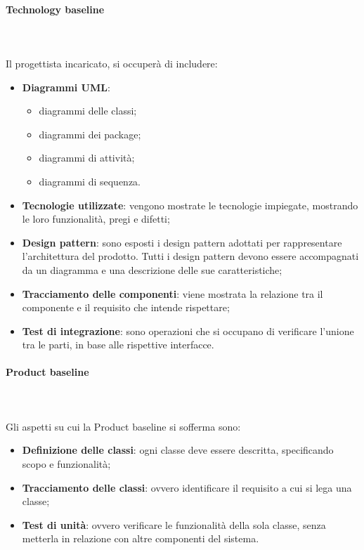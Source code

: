 			\paragraph{Technology baseline} \mbox{} \\ \mbox{} \\
			Il progettista incaricato, si occuperà di includere:
			\begin{itemize}
				\item \textbf{Diagrammi UML}:
				\begin{itemize}
					\item diagrammi delle classi;
					\item diagrammi dei package;
					\item diagrammi di attività;
					\item diagrammi di sequenza.
				\end{itemize}
				\item \textbf{Tecnologie utilizzate}: vengono mostrate le tecnologie impiegate, mostrando le loro funzionalità, pregi e difetti;
				\item \textbf{Design pattern}\glo : sono esposti i design pattern adottati per rappresentare l'architettura del prodotto. Tutti i design pattern devono essere accompagnati da un diagramma e una descrizione delle sue caratteristiche;
				\item \textbf{Tracciamento delle componenti}: viene mostrata la relazione tra il componente e il requisito che intende rispettare; 
				\item \textbf{Test di integrazione}: sono operazioni che si occupano di verificare l'unione tra le parti, in base alle rispettive interfacce.
			\end{itemize}
			\paragraph{Product baseline} \mbox{} \\ \mbox{} \\
			Gli aspetti su cui la  Product baseline si sofferma sono:
				\begin{itemize}
					\item \textbf{Definizione delle classi}: ogni classe deve essere descritta, specificando scopo e funzionalità;
					\item \textbf{Tracciamento delle classi}: ovvero identificare il requisito a cui si lega una classe;
					\item \textbf{Test di unità}: ovvero verificare le funzionalità della sola classe, senza metterla in relazione con altre componenti del sistema.
				\end{itemize}
